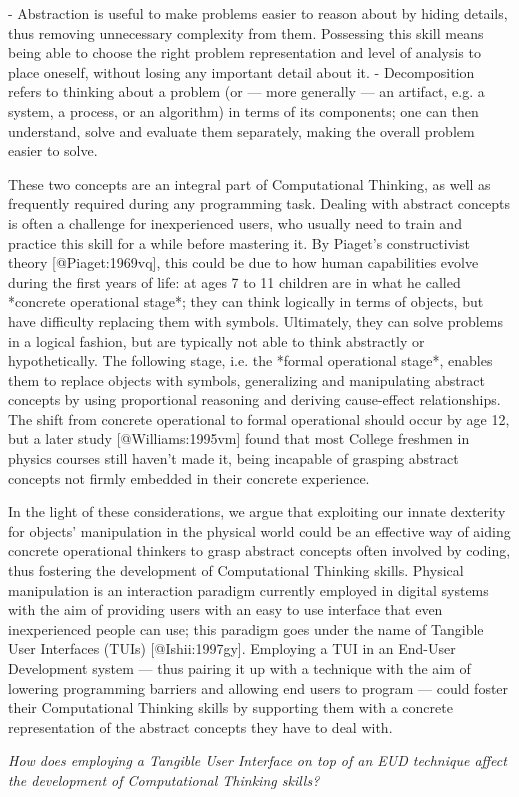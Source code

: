 - Abstraction is useful to make problems easier to reason about by hiding details, thus removing unnecessary complexity from them. Possessing this skill means being able to choose the right problem representation and level of analysis to place oneself, without losing any important detail about it.
- Decomposition refers to thinking about a problem (or --- more generally --- an artifact, e.g. a system, a process, or an algorithm) in terms of its components; one can then understand, solve and evaluate them separately, making the overall problem easier to solve.

These two concepts are an integral part of Computational Thinking, as well as frequently required during any programming task. Dealing with abstract concepts is often a challenge for inexperienced users, who usually need to train and practice this skill for a while before mastering it. By Piaget's constructivist theory [@Piaget:1969vq], this could be due to how human capabilities evolve during the first years of life: at ages 7 to 11 children are in what he called *concrete operational stage*; they can think logically in terms of objects, but have difficulty replacing them with symbols. Ultimately, they can solve problems in a logical fashion, but are typically not able to think abstractly or hypothetically. The following stage, i.e. the *formal operational stage*, enables them to replace objects with symbols, generalizing and manipulating abstract concepts by using proportional reasoning and deriving cause-effect relationships. The shift from concrete operational to formal operational should occur by age 12, but a later study [@Williams:1995vm] found that most College freshmen in physics courses still haven't made it, being incapable of grasping abstract concepts not firmly embedded in their concrete experience.

In the light of these considerations, we argue that exploiting our innate dexterity for objects' manipulation in the physical world could be an effective way of aiding concrete operational thinkers to grasp abstract concepts often involved by coding, thus fostering the development of Computational Thinking skills. Physical manipulation is an interaction paradigm currently employed in digital systems with the aim of providing users with an easy to use interface that even inexperienced people can use; this paradigm goes under the name of Tangible User Interfaces (TUIs) [@Ishii:1997gy]. Employing a TUI in an End-User Development system --- thus pairing it up with a technique with the aim of lowering programming barriers and allowing end users to program --- could foster their Computational Thinking skills by supporting them with a concrete representation of the abstract concepts they have to deal with.

\emph{How does employing a Tangible User Interface on top of an EUD technique affect the development of Computational Thinking skills?}